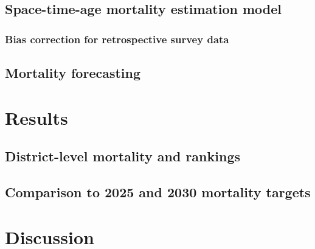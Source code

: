 \documentclass[
]{article}
\begin{document}
\lipsum[1-2]

\hypertarget{space-time-age-mortality-estimation-model}{%
\subsection{Space-time-age mortality estimation model}\label{space-time-age-mortality-estimation-model}}

\lipsum[3-9]

\hypertarget{bias-correction-for-retrospective-survey-data}{%
\subsubsection{Bias correction for retrospective survey data}\label{bias-correction-for-retrospective-survey-data}}

\lipsum[10-11]

\hypertarget{mortality-forecasting}{%
\subsection{Mortality forecasting}\label{mortality-forecasting}}

\lipsum[12-15]

\hypertarget{results}{%
\section{Results}\label{results}}

\lipsum[1-2]

\hypertarget{district-level-mortality-and-rankings}{%
\subsection{District-level mortality and rankings}\label{district-level-mortality-and-rankings}}

\lipsum[3-6]

\hypertarget{comparison-to-2025-and-2030-mortality-targets}{%
\subsection{Comparison to 2025 and 2030 mortality targets}\label{comparison-to-2025-and-2030-mortality-targets}}

\lipsum[7-8]

\hypertarget{discussion}{%
\section{Discussion}\label{discussion}}
\end{document}
